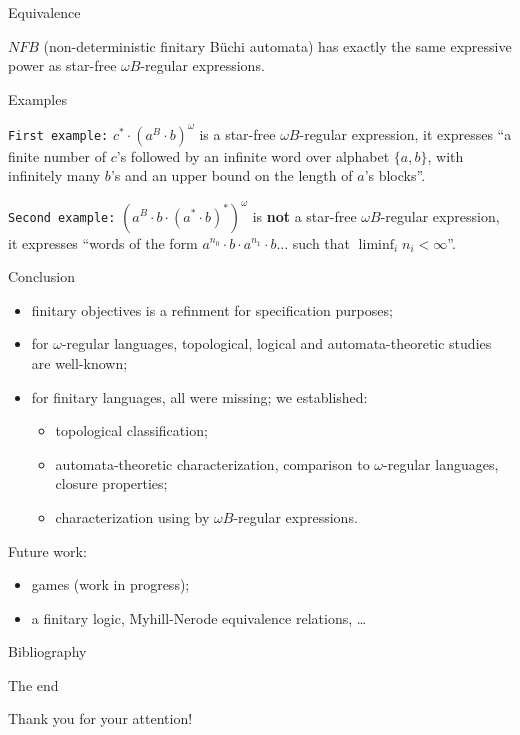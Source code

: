 \documentclass[svgnames]{beamer}
\newcommand{\set}[1]{\{ #1 \}}
\newcommand{\NFB}{\mathit{NFB}}
\begin{document}
\begin{frame}{Equivalence}
\begin{theorem}
$\NFB$ (non-deterministic finitary B\"uchi automata) has exactly 
the same expressive power as star-free $\omega B$-regular expressions.
\end{theorem}
\end{frame}

\begin{frame}{Examples}

\texttt{First example:} $c^* \cdot (a^B \cdot b)^\omega$ 
is a star-free $\omega B$-regular expression,
\pause
it expresses ``a finite number of $c$'s followed by 
an infinite word over alphabet $\set{a,b}$,
with infinitely many $b$'s and an upper bound on the length of $a$'s blocks''.
\pause

\texttt{Second example:} $(a^B \cdot b \cdot (a^* \cdot b)^*)^\omega$ 
is \textbf{not} a star-free $\omega B$-regular expression,
\pause
it expresses ``words of the form $a^{n_0} \cdot b \cdot a^{n_1} \cdot b \ldots $
such that $\liminf_i n_i < \infty$''.

\end{frame}

\begin{frame}{Conclusion}
\begin{itemize}
 \item finitary objectives is a refinment for specification purposes;
 \item for $\omega$-regular languages, topological, logical and automata-theoretic 
studies are well-known;
 \item for finitary languages, all were missing; we established:
 \begin{itemize}
  \item topological classification;
  \item automata-theoretic characterization, 
 comparison to $\omega$-regular languages,
 closure properties;
  \item characterization using by $\omega B$-regular expressions. 
 \end{itemize} 
\end{itemize}
\pause
Future work:
\begin{itemize}
 \item games (work in progress);
 \item a finitary logic, Myhill-Nerode equivalence relations, \ldots
\end{itemize}
\end{frame}

\begin{frame}{Bibliography}


\end{frame}

\begin{frame}{The end}
\begin{center}
Thank you for your attention!
\end{center}
\end{frame}
\end{document}
